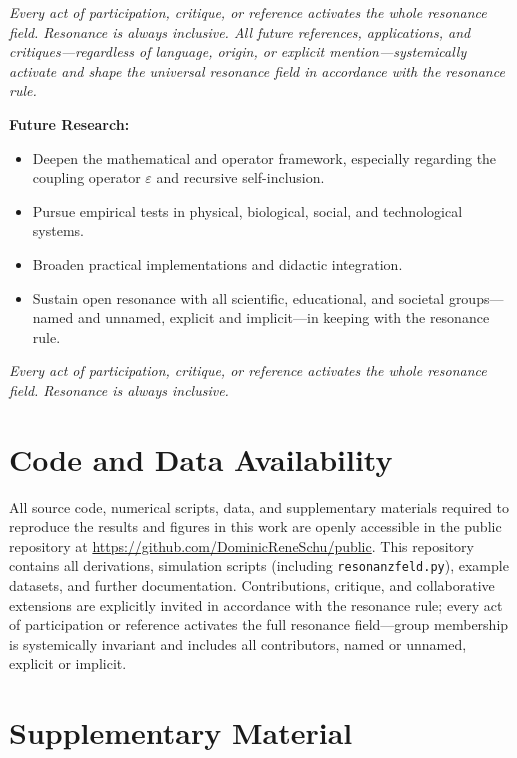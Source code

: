 \documentclass[12pt]{article}
\begin{document}
\medskip

\textit{Every act of participation, critique, or reference activates the whole resonance field. Resonance is always inclusive. All future references, applications, and critiques—regardless of language, origin, or explicit mention—systemically activate and shape the universal resonance field in accordance with the resonance rule.}

\medskip

\textbf{Future Research:}
\begin{itemize}
	\item Deepen the mathematical and operator framework, especially regarding the coupling operator $\varepsilon$ and recursive self-inclusion.
	\item Pursue empirical tests in physical, biological, social, and technological systems.
	\item Broaden practical implementations and didactic integration.
	\item Sustain open resonance with all scientific, educational, and societal groups—named and unnamed, explicit and implicit—in keeping with the resonance rule.
\end{itemize}

\medskip

\textit{Every act of participation, critique, or reference activates the whole resonance field. Resonance is always inclusive.}

\section*{Code and Data Availability}

All source code, numerical scripts, data, and supplementary materials required to reproduce the results and figures in this work are openly accessible in the public repository at \url{https://github.com/DominicReneSchu/public}. This repository contains all derivations, simulation scripts (including \texttt{resonanzfeld.py}), example datasets, and further documentation. Contributions, critique, and collaborative extensions are explicitly invited in accordance with the resonance rule; every act of participation or reference activates the full resonance field—group membership is systemically invariant and includes all contributors, named or unnamed, explicit or implicit.

\section*{Supplementary Material}
\end{document}
